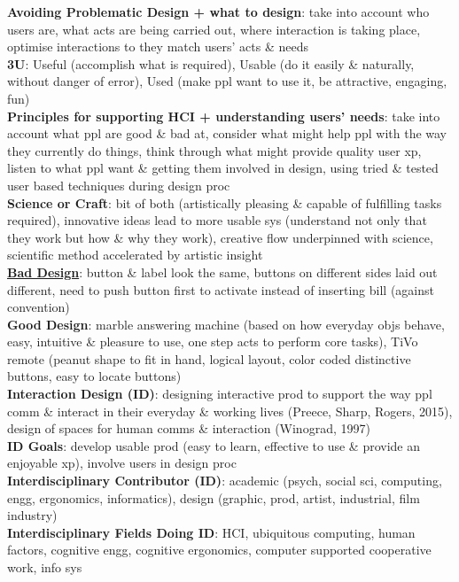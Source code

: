 \documentclass[a4paper]{article}
\begin{document}
\begin{multicols}{3}
        \textbf{Avoiding Problematic Design + what to design}: take into account who users are, what acts are being carried out, where interaction is taking place, optimise interactions to they match users' acts \& needs\\
        \textbf{3U}: Useful (accomplish what is required), Usable (do it easily \& naturally, without danger of error), Used (make ppl want to use it, be attractive, engaging, fun)\\
        \textbf{Principles for supporting HCI + understanding users' needs}: take into account what ppl are good \& bad at, consider what might help ppl with the way they currently do things, think through what might provide quality user xp, listen to what ppl want \& getting them involved in design, using tried \& tested user based techniques during design proc\\
        \textbf{Science or Craft}: bit of both (artistically pleasing \& capable of fulfilling tasks required), innovative ideas lead to more usable sys (understand not only that they work but how \& why they work), creative flow underpinned with science, scientific method accelerated by artistic insight\\
        \underline{\textbf{Bad Design}}: button \& label look the same, buttons on different sides laid out different, need to push button first to activate instead of inserting bill (against convention)\\
        \textbf{Good Design}: marble answering machine (based on how everyday objs behave, easy, intuitive \& pleasure to use, one step acts to perform core tasks), TiVo remote (peanut shape to fit in hand, logical layout, color coded distinctive buttons, easy to locate buttons)\\
        \textbf{Interaction Design (ID)}: designing interactive prod to support the way ppl comm \& interact in their everyday \& working lives (Preece, Sharp, Rogers, 2015), design of spaces for human comms \& interaction (Winograd, 1997)\\
        \textbf{ID Goals}: develop usable prod (easy to learn, effective to use \& provide an enjoyable xp), involve users in design proc\\
        \textbf{Interdisciplinary Contributor (ID)}: academic (psych, social sci, computing, engg, ergonomics, informatics), design (graphic, prod, artist, industrial, film industry)\\
        \textbf{Interdisciplinary Fields Doing ID}: HCI, ubiquitous computing, human factors, cognitive engg, cognitive ergonomics, computer supported cooperative work, info sys\\

\end{multicols}
\end{document}
